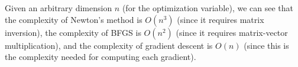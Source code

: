 Given an arbitrary dimension $n$ (for the optimization variable), we can see
that the complexity of Newton's method is $O(n^3)$ (since it requires matrix
inversion), the complexity of BFGS is $O(n^2)$ (since it requires matrix-vector
multiplication), and the complexity of gradient descent is $O(n)$ (since this
is the complexity needed for computing each gradient).


